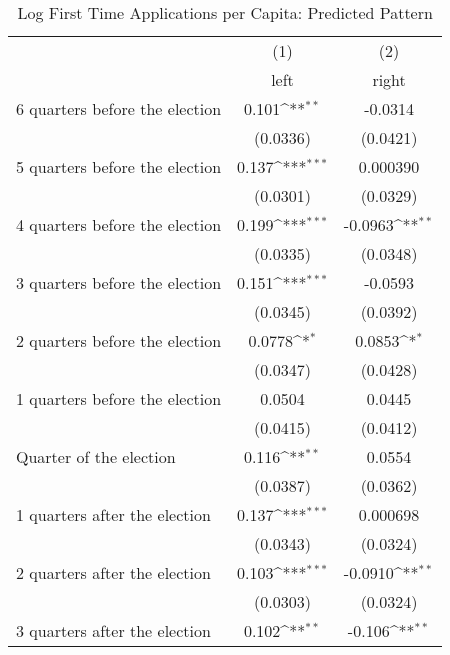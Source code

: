 \begin{table}[htbp]\centering
\def\sym#1{\ifmmode^{#1}\else\(^{#1}\)\fi}
\caption{Log First Time Applications per Capita: Predicted Pattern}
\begin{tabular}{l*{2}{c}}
\hline\hline
                    &\multicolumn{1}{c}{(1)}&\multicolumn{1}{c}{(2)}\\
                    &\multicolumn{1}{c}{left}&\multicolumn{1}{c}{right}\\
\hline
 6 quarters before the election&       0.101\sym{**} &     -0.0314         \\
                    &    (0.0336)         &    (0.0421)         \\
[1em]
 5 quarters before the election&       0.137\sym{***}&    0.000390         \\
                    &    (0.0301)         &    (0.0329)         \\
[1em]
 4 quarters before the election&       0.199\sym{***}&     -0.0963\sym{**} \\
                    &    (0.0335)         &    (0.0348)         \\
[1em]
 3 quarters before the election&       0.151\sym{***}&     -0.0593         \\
                    &    (0.0345)         &    (0.0392)         \\
[1em]
 2 quarters before the election&      0.0778\sym{*}  &      0.0853\sym{*}  \\
                    &    (0.0347)         &    (0.0428)         \\
[1em]
 1 quarters before the election&      0.0504         &      0.0445         \\
                    &    (0.0415)         &    (0.0412)         \\
[1em]
Quarter of the election&       0.116\sym{**} &      0.0554         \\
                    &    (0.0387)         &    (0.0362)         \\
[1em]
 1 quarters after the election&       0.137\sym{***}&    0.000698         \\
                    &    (0.0343)         &    (0.0324)         \\
[1em]
 2 quarters after the election&       0.103\sym{***}&     -0.0910\sym{**} \\
                    &    (0.0303)         &    (0.0324)         \\
[1em]
 3 quarters after the election&       0.102\sym{**} &      -0.106\sym{**} \\

\end{tabular}
\end{table}
